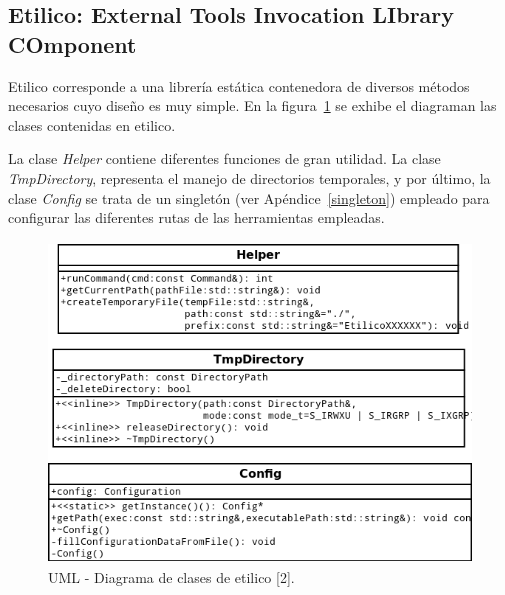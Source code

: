 \subsection{Etilico: External Tools Invocation LIbrary COmponent}
\par Etilico corresponde a una librería estática contenedora de diversos métodos necesarios cuyo diseño es muy simple. En la figura~\ref{disenioEtilico} se exhibe el diagraman las clases contenidas en etilico.
\par La clase \emph{Helper} contiene diferentes funciones de gran utilidad. La clase \emph{TmpDirectory}, representa el manejo de directorios temporales, y por último, la clase \emph{Config} se trata de un singletón (ver Apéndice~\ref{singleton}) empleado para configurar las diferentes rutas de las herramientas empleadas.

\begin{figure}[!hbtp]
	\begin{center}
		\includegraphics[width=13cm, height=8.5cm]{image/etilico.png}
		\caption{UML - Diagrama de clases de etilico [2].}
		\label{disenioEtilico}
	\end{center}
\end{figure}